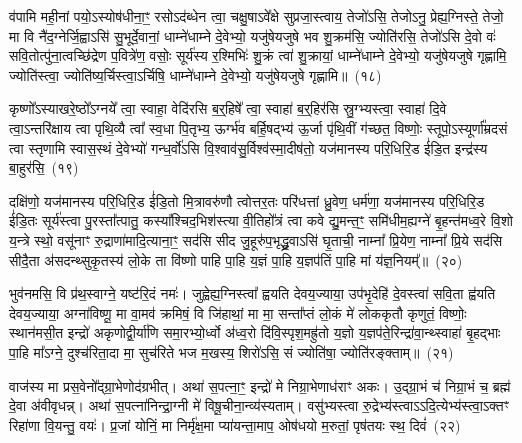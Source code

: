 व॑पामि मही॒नां पयो॒\-ऽस्योष॑धीना॒ꣳ॒ रसो\-ऽद॑ब्धेन त्वा॒ चक्षु॒षा\-ऽवे᳚क्षे सुप्रजा॒स्त्वाय॒ तेजो॑\-ऽसि॒ तेजो\-ऽनु॒ प्रेह्य॒ग्निस्ते॒ तेजो॒ मा वि नै॑द॒ग्नेर्जि॒ह्वा\-ऽसि॑ सु॒भूर्दे॒वानां॒ धाम्ने॑धाम्ने दे॒वेभ्यो॒ यजु॑षेयजुषे भव शु॒क्रम॑सि॒ ज्योति॑रसि॒ तेजो॑\-ऽसि दे॒वो वः॑ सवि॒तोत्पु॑ना॒त्वच्छि॑द्रेण प॒वित्रे॑ण॒ वसोः॒ सूर्य॑स्य र॒श्मिभिः॑ शु॒क्रं त्वा॑ शु॒क्रायां॒ धाम्ने॑धाम्ने दे॒वेभ्यो॒ यजु॑षेयजुषे गृह्णामि॒ ज्योति॑स्त्वा॒ ज्योति॑ष्य॒र्चिस्त्वा॒\-ऽर्चिषि॒ धाम्ने॑धाम्ने दे॒वेभ्यो॒ यजु॑षेयजुषे गृह्णामि॥~(१८)

{\anuvakamend[{उप॒ नी र॒श्मिभिः॑ शु॒क्रꣳ षोड॑श च}]}

कृष्णो᳚\-ऽस्याखरे॒ष्ठो᳚\-ऽग्नये᳚ त्वा॒ स्वाहा॒ वेदि॑रसि ब॒र्॒हिषे᳚ त्वा॒ स्वाहा॑ ब॒र्॒हिर॑सि स्रु॒ग्भ्यस्त्वा॒ स्वाहा॑ दि॒वे त्वा॒\-ऽन्तरि॑क्षाय त्वा पृथि॒व्यै त्वा᳚ स्व॒धा पि॒तृभ्य॒ ऊर्ग्भ॑व बर्\mbox{}हि॒षद्भ्य॑ ऊ॒र्जा पृ॑थि॒वीं ग॑च्छत॒ विष्णोः॒ स्तूपो॒\-ऽस्यूर्णा᳚म्रदसं त्वा स्तृणामि स्वास॒स्थं दे॒वेभ्यो॑ गन्ध॒र्वो॑\-ऽसि वि॒श्वाव॑सु॒र्विश्व॑स्मा॒दीष॑तो॒ यज॑मानस्य परि॒धिरि॒ड ई॑डि॒त इन्द्र॑स्य बा॒हुर॑सि॒~(१९)

दक्षि॑णो॒ यज॑मानस्य परि॒धिरि॒ड ई॑डि॒तो मि॒त्रावरु॑णौ त्वोत्तर॒तः परि॑धत्तां ध्रु॒वेण॒ धर्म॑णा॒ यज॑मानस्य परि॒धिरि॒ड ई॑डि॒तः सूर्य॑स्त्वा पु॒रस्ता᳚त्पातु॒ कस्या᳚श्चिद॒भिश॑स्त्या वी॒तिहो᳚त्रं त्वा कवे द्यु॒मन्त॒ꣳ॒ समि॑धीम॒ह्यग्ने॑ बृ॒हन्त॑मध्व॒रे वि॒शो य॒न्त्रे स्थो॒ वसू॑नाꣳ रु॒द्राणा॑मादि॒त्याना॒ꣳ॒ सद॑सि सीद जु॒हूरु॑प॒भृद्ध्रु॒वा\-ऽसि॑ घृ॒ताची॒ नाम्ना᳚ प्रि॒येण॒ नाम्ना᳚ प्रि॒ये सद॑सि सीदै॒ता अ॑सदन्थ्सुकृ॒तस्य॑ लो॒के ता वि॑ष्णो पाहि पा॒हि य॒ज्ञं पा॒हि य॒ज्ञप॑तिं पा॒हि मां य॑ज्ञ॒नियम्᳚॥~(२०)

{\anuvakamend[{बा॒हुर॑सि प्रि॒ये सद॑सि पञ्च॑दश च}]}

भुव॑नमसि॒ वि प्र॑थ॒स्वाग्ने॒ यष्ट॑रि॒दं नमः॑। जुह्वेह्य॒ग्निस्त्वा᳚ ह्वयति देवय॒ज्याया॒ उप॑भृ॒देहि॑ दे॒वस्त्वा॑ सवि॒ता ह्व॑यति देवय॒ज्याया॒ अग्ना॑विष्णू॒ मा वा॒मव॑ क्रमिषं॒ वि जि॑हाथां॒ मा मा॒ सन्ता᳚प्तं लो॒कं मे॑ लोककृतौ कृणुतं॒ विष्णोः॒ स्थान॑मसी॒त इन्द्रो॑ अकृणोद्वी॒र्या॑णि समा॒रभ्यो॒र्ध्वो अ॑ध्व॒रो दि॑वि॒स्पृश॒मह्रु॑तो य॒ज्ञो य॒ज्ञप॑ते॒रिन्द्रा॑वा॒न्थ्स्वाहा॑ बृ॒हद्भाः पा॒हि मा᳚ऽग्ने॒ दुश्च॑रिता॒दा मा॒ सुच॑रिते भज म॒खस्य॒ शिरो॑\-ऽसि॒ सं ज्योति॑षा॒ ज्योति॑रङ्क्ताम्॥~(२१)

{\anuvakamend[{अह्रु॑त॒ एक॑विꣳशतिश्च}]}

वाज॑स्य मा प्रस॒वेनो᳚द्ग्रा॒भेणोद॑ग्रभीत्। अथा॑ स॒पत्ना॒ꣳ॒ इन्द्रो॑ मे निग्रा॒भेणाध॑राꣳ अकः। उ॒द्ग्रा॒भं च॑ निग्रा॒भं च॒ ब्रह्म॑ दे॒वा अ॑वीवृधन्न्। अथा॑ स॒पत्ना॑निन्द्रा॒ग्नी मे॑ विषू॒चीना॒न्व्य॑स्यताम्। वसु॑भ्यस्त्वा रु॒द्रेभ्य॑स्त्वा\-ऽ\-ऽदि॒त्येभ्य॑स्त्वा॒ऽक्तꣳ रिहा॑णा वि॒यन्तु॒ वयः॑। प्र॒जां योनिं॒ मा निर्मृ॑क्ष॒मा प्या॑यन्ता॒माप॒ ओष॑धयो म॒रुतां॒ पृष॑तयः स्थ॒ दिवं॑~(२२)

